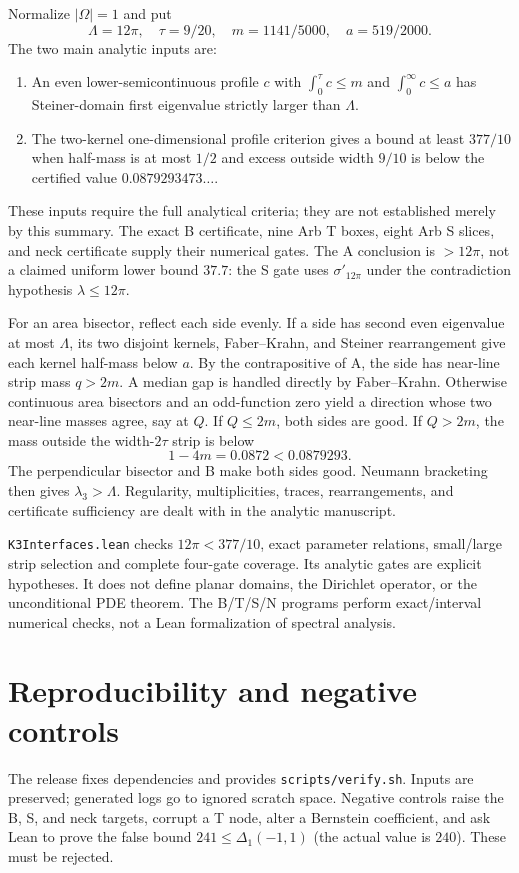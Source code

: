 \documentclass[11pt]{article}
\begin{document}
Normalize $|\Omega|=1$ and put
\[
 \Lambda=12\pi,\quad \tau=9/20,\quad m=1141/5000,\quad a=519/2000.
\]
The two main analytic inputs are:
\begin{enumerate}
\item[(A)] An even lower-semicontinuous profile $c$ with $\int_0^\tau c\leq m$ and $\int_0^\infty c\leq a$ has Steiner-domain first eigenvalue strictly larger than $\Lambda$.
\item[(B)] The two-kernel one-dimensional profile criterion gives a bound at least $377/10$ when half-mass is at most $1/2$ and excess outside width $9/10$ is below the certified value $0.0879293473\ldots$.
\end{enumerate}
These inputs require the full analytical criteria; they are not established merely by this summary. The exact B certificate, nine Arb T boxes, eight Arb S slices, and neck certificate supply their numerical gates. The A conclusion is $>12\pi$, not a claimed uniform lower bound $37.7$: the S gate uses $\sigma'_{12\pi}$ under the contradiction hypothesis $\lambda\leq12\pi$.

For an area bisector, reflect each side evenly. If a side has second even eigenvalue at most $\Lambda$, its two disjoint kernels, Faber--Krahn, and Steiner rearrangement give each kernel half-mass below $a$. By the contrapositive of A, the side has near-line strip mass $q>2m$. A median gap is handled directly by Faber--Krahn. Otherwise continuous area bisectors and an odd-function zero yield a direction whose two near-line masses agree, say at $Q$. If $Q\leq2m$, both sides are good. If $Q>2m$, the mass outside the width-$2\tau$ strip is below
\[
 1-4m=0.0872<0.0879293.
\]
The perpendicular bisector and B make both sides good. Neumann bracketing then gives $\lambda_3>\Lambda$. Regularity, multiplicities, traces, rearrangements, and certificate sufficiency are dealt with in the analytic manuscript.

\texttt{K3Interfaces.lean} checks $12\pi<377/10$, exact parameter relations, small/large strip selection and complete four-gate coverage. Its analytic gates are explicit hypotheses. It does not define planar domains, the Dirichlet operator, or the unconditional PDE theorem. The B/T/S/N programs perform exact/interval numerical checks, not a Lean formalization of spectral analysis.
\section{Reproducibility and negative controls}
The release fixes dependencies and provides \texttt{scripts/verify.sh}. Inputs are preserved; generated logs go to ignored scratch space. Negative controls raise the B, S, and neck targets, corrupt a T node, alter a Bernstein coefficient, and ask Lean to prove the false bound $241\leq\Delta_1(-1,1)$ (the actual value is $240$). These must be rejected.
\end{document}
